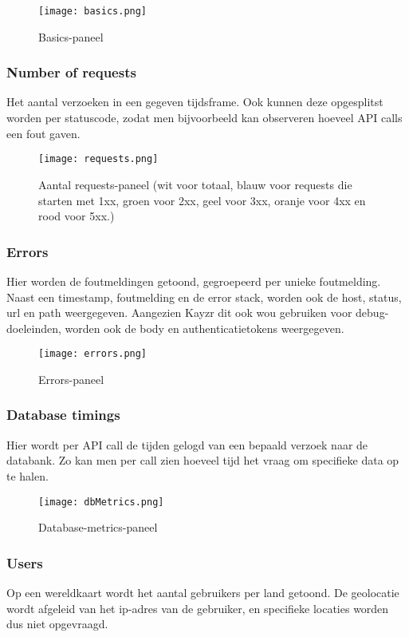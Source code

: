 \begin{figure}[h!]
	\centering
	\texttt{[image: basics.png]}
	\caption{Basics-paneel}
	\label{fig:basics}
\end{figure}

\subsubsection{Number of requests}
\label{sec:numberofrequests}
Het aantal verzoeken in een gegeven tijdsframe. Ook kunnen deze opgesplitst worden per statuscode, zodat men bijvoorbeeld kan observeren hoeveel API calls een fout gaven.

\begin{figure}[h!]
	\centering
	\texttt{[image: requests.png]}
	\caption{Aantal requests-paneel (wit voor totaal, blauw voor requests die starten met 1xx, groen voor 2xx, geel voor 3xx, oranje voor 4xx en rood voor 5xx.)}
	\label{fig:requests}
\end{figure}

\subsubsection{Errors}
\label{sec:errors}
Hier worden de foutmeldingen getoond, gegroepeerd per unieke foutmelding. Naast een timestamp, foutmelding en de error stack, worden ook de host, status, url en path weergegeven. Aangezien Kayzr dit ook wou gebruiken voor debug-doeleinden, worden ook de body en authenticatietokens weergegeven.

\begin{figure}[h!]
	\centering
	\texttt{[image: errors.png]}
	\caption{Errors-paneel}
	\label{fig:errors}
\end{figure}

\subsubsection{Database timings}
\label{sec:dbtimings}
Hier wordt per API call de tijden gelogd van een bepaald verzoek naar de databank. Zo kan men per call zien hoeveel tijd het vraag om specifieke data op te halen.

\begin{figure}[h!]
	\centering
	\texttt{[image: dbMetrics.png]}
	\caption{Database-metrics-paneel}
	\label{fig:dbMetrics}
\end{figure}

\subsubsection{Users}
\label{sec:users}
Op een wereldkaart wordt het aantal gebruikers per land getoond. De geolocatie wordt afgeleid van het ip-adres van de gebruiker, en specifieke locaties worden dus niet opgevraagd.

